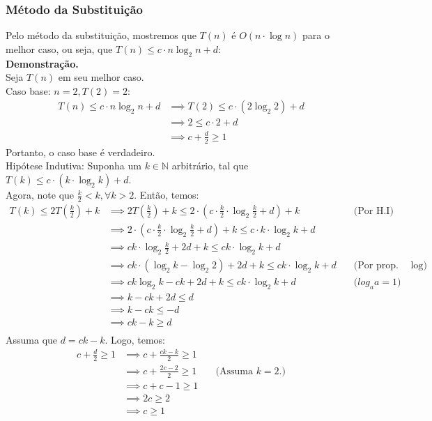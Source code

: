 \subsubsection{Método da Substituição}

Pelo método da substituição, mostremos que $T(n)$ é $O(n \cdot \log n)$ para o melhor caso, ou seja, que $T(n) \le c \cdot n \log_2 n + d$: \\
\textbf{Demonstração.} \\
Seja $T(n)$ em seu melhor caso. \\
Caso base: $n = 2, T(2) = 2$:
\begin{align*} 
  T(n) \le c \cdot n \log_2 n + d & \implies T(2) \le c \cdot (2 \log_2 2) + d \\ 
  &\implies 2 \le c \cdot 2 + d\\ 
  &\implies c + \frac{d}{2} \ge 1 
\end{align*}
Portanto, o caso base é verdadeiro. \\
Hipótese Indutiva: Suponha um $k \in \mathbb{N}$ arbitrário, tal que $T(k) \le c \cdot (k \cdot \log_2 k) + d$. \\
Agora, note que $\frac{k}{2} < k, \forall k > 2$. Então, temos:
\begin{align*}
  T(k) \le 2T(\frac{k}{2}) + k  & \implies 2T(\frac{k}{2}) + k \le 2 \cdot (c \cdot \frac{k}{2} \cdot \log_2 \frac{k}{2} + d) + k & \quad \text{(Por H.I)} \\
  & \implies 2 \cdot (c \cdot \frac{k}{2} \cdot \log_2 \frac{k}{2} + d) + k  \le c \cdot k \cdot \log_2 k + d \\
  & \implies ck \cdot \log_2 \frac{k}{2} + 2d + k \le ck \cdot \log_2 k + d \\
  & \implies ck \cdot (\log_2 k - \log_2 2) + 2d + k \le ck \cdot \log_2 k + d & \quad \text{(Por prop. de $\log$)} \\
  & \implies ck\log_2 k - ck  + 2d + k \le ck \cdot \log_2 k + d & \quad \text{($log_a a = 1$)} \\
  & \implies k - ck  + 2d \le d \\
  & \implies k - ck \le -d \\
  & \implies ck - k \ge d \\
\end{align*}
Assuma que $d = ck - k$. Logo, temos:
\begin{align*}
  c + \frac{d}{2} \ge 1 & \implies c + \frac{ck - k}{2} \ge 1 \\
  & \implies c + \frac{2c - 2}{2} \ge 1 & \quad \text{(Assuma $k = 2$.)} \\
  & \implies c + c - 1 \ge 1 \\
  & \implies 2c \ge 2 \\
  & \implies c \ge 1 \\
\end{align*}
